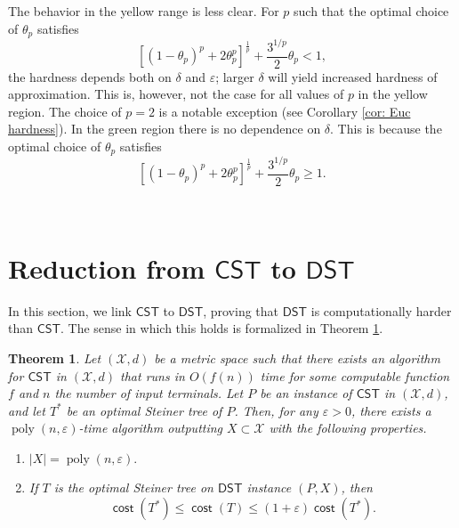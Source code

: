 \documentclass{article}\providecommand{\DeclareRedundantLanguages}[2]{}\usepackage[a4paper,margin=20mm]{geometry}
\newtheorem{theorem}{Theorem}\newtheorem{lemma}[theorem]{Lemma}\newtheorem{proposition}[theorem]{Proposition}\newtheorem{corollary}[theorem]{Corollary}\newtheorem{definition}[theorem]{Definition}\newtheorem{claim}[theorem]{Claim}\newtheorem{remark}[theorem]{Remark}\newtheorem{observation}[theorem]{Observation}\newtheorem{conjecture}[theorem]{Conjecture}\newtheorem{example}[theorem]{Example}
\DeclareMathOperator{\cost}{\mathsf{cost}}
\DeclareMathOperator{\poly}{poly}
\newcommand{\1}{\textbf{1}}
\newcommand{\cst}{$\mathsf{CST}$\xspace}
\newcommand{\dst}{$\mathsf{DST}$\xspace}
\newcommand{\pcoord}{\theta_p}
\begin{document}
The behavior in the yellow range is less clear. For $p$ such that the optimal choice of $\theta_p$ satisfies
\[
[(1-\pcoord)^p + 2\pcoord^p]^{\frac{1}{p}} +\frac{3^{1/p}}{2}\pcoord < 1,
\]
the hardness depends both on $\delta$ and $\varepsilon$; larger $\delta$ will yield increased hardness of approximation. This is, however, not the case for all values of $p$ in the yellow region. The choice of $p=2$ is a notable exception (see Corollary \ref{cor: Euc hardness}). In the green region there is no dependence on $\delta$. This is because the optimal choice of $\theta_p$ satisfies
\[
[(1-\pcoord)^p + 2\pcoord^p]^{\frac{1}{p}} +\frac{3^{1/p}}{2}\pcoord \geq 1.
\]


~\section{Reduction from \texorpdfstring{\cst}{CST} to \texorpdfstring{\dst}{DST}} \label{sec: reduction from cst to dst}
In this section, we link \cst to \dst, proving that \dst is computationally harder than \cst. The sense in which this holds is formalized in Theorem \ref{thm: reduction from cst to dst}.
\begin{theorem} \label{thm: reduction from cst to dst}
Let $(\mathcal{X}, d)$ be a metric space such that there exists an algorithm for \cst in $(\mathcal{X}, d)$ that runs in $O(f(n))$ time for some computable function $f$ and $n$ the number of input terminals. Let $P$ be an instance of \cst in $(\mathcal{X}, d)$, and let $T^*$ be an optimal Steiner tree of $P$. Then, for any $\varepsilon > 0$, there exists a $\poly(n, \varepsilon)$-time algorithm outputting $X \subset \mathcal{X}$  with the following properties.
\begin{enumerate}
    \item $|X| = \poly(n, \varepsilon).$
    \item If $T$ is the optimal Steiner tree on \dst instance $(P, X)$, then 
    \[
    \cost(T^*) \leq \cost(T) \leq (1 + \varepsilon)\cost(T^*).
    \]
\end{enumerate}
\end{theorem}
\end{document}
